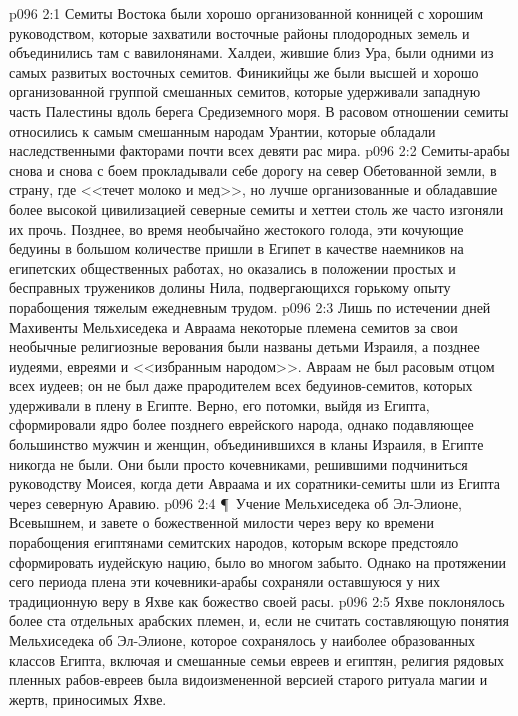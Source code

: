 \vs p096 2:1 Семиты Востока были хорошо организованной конницей с хорошим руководством, которые захватили восточные районы плодородных земель и объединились там с вавилонянами. Халдеи, жившие близ Ура, были одними из самых развитых восточных семитов. Финикийцы же были высшей и хорошо организованной группой смешанных семитов, которые удерживали западную часть Палестины вдоль берега Средиземного моря. В расовом отношении семиты относились к самым смешанным народам Урантии, которые обладали наследственными факторами почти всех девяти рас мира.
\vs p096 2:2 Семиты\hyp{}арабы снова и снова с боем прокладывали себе дорогу на север Обетованной земли, в страну, где <<течет молоко и мед>>, но лучше организованные и обладавшие более высокой цивилизацией северные семиты и хеттеи столь же часто изгоняли их прочь. Позднее, во время необычайно жестокого голода, эти кочующие бедуины в большом количестве пришли в Египет в качестве наемников на египетских общественных работах, но оказались в положении простых и бесправных тружеников долины Нила, подвергающихся горькому опыту порабощения тяжелым ежедневным трудом.
\vs p096 2:3 Лишь по истечении дней Махивенты Мельхиседека и Авраама некоторые племена семитов за свои необычные религиозные верования были названы детьми Израиля, а позднее иудеями, евреями и <<избранным народом>>. Авраам не был расовым отцом всех иудеев; он не был даже прародителем всех бедуинов\hyp{}семитов, которых удерживали в плену в Египте. Верно, его потомки, выйдя из Египта, сформировали ядро более позднего еврейского народа, однако подавляющее большинство мужчин и женщин, объединившихся в кланы Израиля, в Египте никогда не были. Они были просто кочевниками, решившими подчиниться руководству Моисея, когда дети Авраама и их соратники\hyp{}семиты шли из Египта через северную Аравию.
\vs p096 2:4 \P\ Учение Мельхиседека об Эл\hyp{}Элионе, Всевышнем, и завете о божественной милости через веру ко времени порабощения египтянами семитских народов, которым вскоре предстояло сформировать иудейскую нацию, было во многом забыто. Однако на протяжении сего периода плена эти кочевники\hyp{}арабы сохраняли оставшуюся у них традиционную веру в Яхве как божество своей расы.
\vs p096 2:5 Яхве поклонялось более ста отдельных арабских племен, и, если не считать составляющую понятия Мельхиседека об Эл\hyp{}Элионе, которое сохранялось у наиболее образованных классов Египта, включая и смешанные семьи евреев и египтян, религия рядовых пленных рабов\hyp{}евреев была видоизмененной версией старого ритуала магии и жертв, приносимых Яхве.
